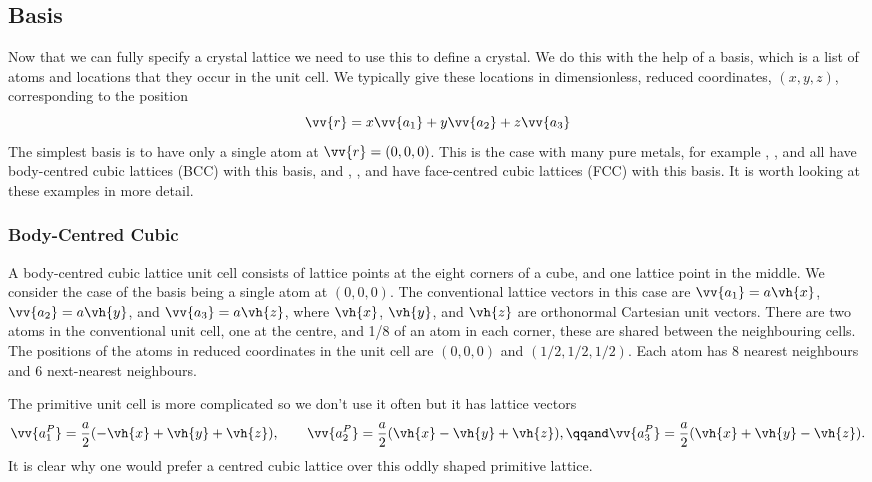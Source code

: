 \documentclass[fleqn]{NotesClass}
\begin{document}
    \subsection{Basis}
    Now that we can fully specify a crystal lattice we need to use this to define a crystal.
    We do this with the help of a basis, which is a list of atoms and locations that they occur in the unit cell.
    We typically give these locations in dimensionless, reduced coordinates, \((x, y, z)\), corresponding to the position
    \begin{equation}
        \vv{r} = x\vv{a_1} + y\vv{a_2} + z\vv{a_3}
    \end{equation}
    The simplest basis is to have only a single atom at \(\vv{r} = (0, 0, 0)\).
    This is the case with many pure metals, for example , , and  all have body-centred cubic lattices (BCC) with this basis, and , , and  have face-centred cubic lattices (FCC) with this basis.
    It is worth looking at these examples in more detail.
    
    \subsubsection{Body-Centred Cubic}
    A body-centred cubic lattice unit cell consists of lattice points at the eight corners of a cube, and one lattice point in the middle.
    We consider the case of the basis being a single atom at \((0, 0, 0)\).
    The conventional lattice vectors in this case are \(\vv{a_1} = a\vh{x}\), \(\vv{a_2} = a\vh{y}\), and \(\vv{a_3} = a\vh{z}\), where \(\vh{x}\), \(\vh{y}\), and \(\vh{z}\) are orthonormal Cartesian unit vectors.
    There are two atoms in the conventional unit cell, one at the centre, and 1/8 of an atom in each corner, these are shared between the neighbouring cells.
    The positions of the atoms in reduced coordinates in the unit cell are \((0, 0, 0)\) and \((1/2, 1/2, 1/2)\).
    Each atom has 8 nearest neighbours and 6 next-nearest neighbours.
    
    The primitive unit cell is more complicated so we don't use it often but it has lattice vectors
    \begin{equation}
        \vv{a_1^P} = \frac{a}{2}(-\vh{x} + \vh{y} + \vh{z}), \qquad \vv{a_2^P} = \frac{a}{2}(\vh{x} - \vh{y} + \vh{z}), \qqand \vv{a_3^P} = \frac{a}{2}(\vh{x} + \vh{y} - \vh{z}).
    \end{equation}
    It is clear why one would prefer a centred cubic lattice over this oddly shaped primitive lattice.
    
\end{document}
